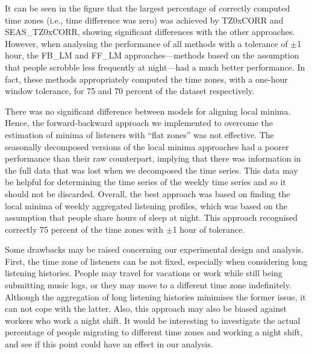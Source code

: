 It can be seen in the figure that the largest percentage of correctly computed time zones (i.e., time difference was zero) was achieved by TZ0xCORR and SEAS\_TZ0xCORR, showing significant differences with the other approaches. 
However, when analysing the performance of all methods with a tolerance of $\pm$1 hour, the FB\_LM and FF\_LM approaches---methods based on the assumption that people scrobble less frequently at night---had a much better performance. In fact, these methods appropriately computed the time zones, with a one-hour window tolerance, for 75 and 70 percent of the dataset respectively. 

There was no significant difference between models for aligning local minima. Hence, the forward-backward approach we implemented to overcome the estimation of minima of listeners with ``flat zones'' was not effective. 
The seasonally decomposed versions of the local minima approaches had a poorer performance than their raw counterpart, implying that there was information in the full data that was lost when we decomposed the time series. This data may be helpful for determining the time series of the weekly time series and so it should not be discarded.
Overall, the best approach was based on finding the local minima of weekly aggregated listening profiles, which was based on the assumption that people share hours of sleep at night. This approach recognised correctly 75 percent of the time zones with $\pm$1 hour of tolerance. 

Some drawbacks may be raised concerning our experimental design and analysis. 
First, the time zone of listeners can be not fixed, especially when considering long listening histories. People may travel for vacations or work while still being submitting music logs, or they may move to a different time zone indefinitely. Although the aggregation of long listening histories minimises the former issue, it can not cope with the latter. Also, this approach may also be biased against workers who work a night shift. It would be interesting to investigate the actual percentage of people migrating to different time zones and working a night shift, and see if this point could have an effect in our analysis. 


